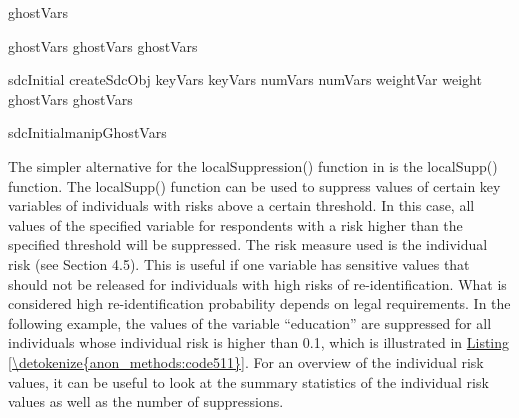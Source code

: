 \documentclass[letterpaper,10pt,english]{sphinxmanual}
\begin{document}
\def\sphinxLiteralBlockLabel{\label{\detokenize{anon_methods:code510}}}
%
\begin{sphinxVerbatim}[commandchars=\\\{\},numbers=left,firstnumber=1,stepnumber=1]
 ghostVars  

 ghostVars\PYG{p}{[[}\PYG{p}{]]}  
 ghostVars\PYG{p}{[[}\PYG{p}{]]}\PYG{p}{[[}\PYG{p}{]]}  
 ghostVars\PYG{p}{[[}\PYG{p}{]]}\PYG{p}{[[}\PYG{p}{]]}  

 sdcInitial  createSdcObj keyVars  keyVars numVars  numVars weightVar  weight ghostVars  ghostVars

 sdcInitialmanipGhostVars
\end{sphinxVerbatim}

The simpler alternative for the localSuppression() function in
 is the localSupp() function. The localSupp() function can be
used to suppress values of certain key variables of individuals with
risks above a certain threshold. In this case, all values of the
specified variable for respondents with a risk higher than the specified
threshold will be suppressed. The risk measure used is the individual
risk (see Section 4.5). This is useful if one variable has sensitive
values that should not be released for individuals with high risks of
re-identification. What is considered high re-identification probability
depends on legal requirements. In the following example, the values of
the variable “education” are suppressed for all individuals whose
individual risk is higher than 0.1, which is illustrated in \hyperref[\detokenize{anon_methods:code511}]{Listing \ref{\detokenize{anon_methods:code511}}}.
For an overview of the individual risk values, it can be useful to
look at the summary statistics of the individual risk values as well as
the number of suppressions.
\end{document}
